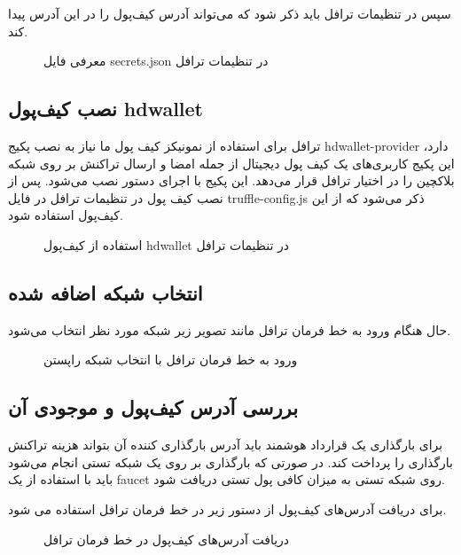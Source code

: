 سپس در تنظیمات ترافل باید ذکر شود که می‌تواند آدرس کیف‌پول را در این آدرس پیدا کند.

\begin{figure}[ht]
\centerline{}
\caption{معرفی فایل secrets.json در تنظیمات ترافل}
\label{fig:secrets-in-config}
\end{figure}


\subsection{نصب کیف‌پول hdwallet}
ترافل برای استفاده از نمونیکز کیف پول ما نیاز به نصب پکیج hdwallet-provider دارد، این پکیج کاربری‌های یک کیف پول دیجیتال از جمله امضا و ارسال تراکنش بر روی شبکه بلاکچین را در اختیار ترافل قرار می‌دهد. این پکیج با اجرای دستور
نصب می‌شود.  پس از نصب کیف پول در تنظیمات ترافل در فایل truffle-config.js ذکر می‌شود که از این کیف‌پول استفاده شود.

\begin{figure}[ht]
\centerline{}
\caption{استفاده از کیف‌پول hdwallet در تنظیمات ترافل}
\label{fig:wallet-in-config}
\end{figure}


\subsection{انتخاب شبکه اضافه شده}
حال هنگام ورود به خط فرمان ترافل مانند تصویر زیر شبکه مورد نظر انتخاب می‌شود.

\begin{figure}[ht]
\centerline{}
\caption{ورود به خط فرمان ترافل با انتخاب شبکه راپستن}
\label{fig:truffle-console}
\end{figure}


\subsection{بررسی آدرس کیف‌پول و موجودی آن}
برای بارگذاری یک قرارداد هوشمند باید آدرس بارگذاری کننده آن بتواند هزینه تراکنش بارگذاری را پرداخت کند. در صورتی که بارگذاری بر روی یک شبکه تستی انجام می‌شود باید با استفاده از یک faucet روی شبکه تستی به میزان کافی پول تستی دریافت شود.

برای دریافت آدرس‌های کیف‌پول از دستور زیر در خط فرمان ترافل استفاده می شود.

\begin{figure}[ht]
\centerline{}
\caption{دریافت آدرس‌های کیف‌پول در خط فرمان ترافل}
\label{fig:get-addresses}
\end{figure}

